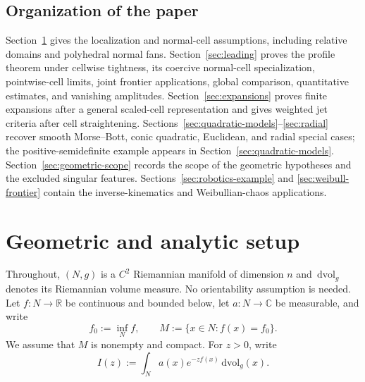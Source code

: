 \documentclass[11pt]{amsart}
\numberwithin{equation}{section}
\theoremstyle{definition}
\theoremstyle{remark}
\newcommand{\R}{\mathbb{R}}
\newcommand{\C}{\mathbb{C}}
\newcommand{\dvol}{\,\mathrm{dvol}}
\begin{document}
\subsection*{Organization of the paper}

Section~\ref{sec:setup} gives the localization and normal-cell assumptions,
including relative domains and polyhedral normal fans.  Section~\ref{sec:leading}
proves the profile theorem under cellwise tightness, its coercive normal-cell
specialization, pointwise-cell limits, joint frontier applications, global
comparison, quantitative estimates, and vanishing amplitudes.
Section~\ref{sec:expansions} proves finite expansions after a general
scaled-cell representation and gives weighted jet criteria after cell
straightening.  Sections~\ref{sec:quadratic-models}--\ref{sec:radial} recover
smooth Morse--Bott, conic quadratic, Euclidean, and radial special cases; the
positive-semidefinite example appears in Section~\ref{sec:quadratic-models}.
Section~\ref{sec:geometric-scope} records the scope of the geometric hypotheses
and the excluded singular features.  Sections~\ref{sec:robotics-example} and
\ref{sec:weibull-frontier} contain the inverse-kinematics and Weibullian-chaos
applications.

\section{Geometric and analytic setup}\label{sec:setup}

Throughout, $(N,g)$ is a $C^2$ Riemannian manifold of dimension $n$ and
$\dvol_g$ denotes its Riemannian volume measure.  No orientability assumption is
needed.  Let $f:N\to\R$ be continuous and bounded below, let
$a:N\to\C$ be measurable, and write
\begin{equation}\label{eq:def-M}
  f_0:=\inf_N f,\qquad M:=\{x\in N:f(x)=f_0\}.
\end{equation}
We assume that $M$ is nonempty and compact.  For $z>0$, write
\begin{equation}\label{eq:standing-global-integral}
  I(z):=\int_N a(x)e^{-zf(x)}\dvol_g(x).
\end{equation}
\end{document}
